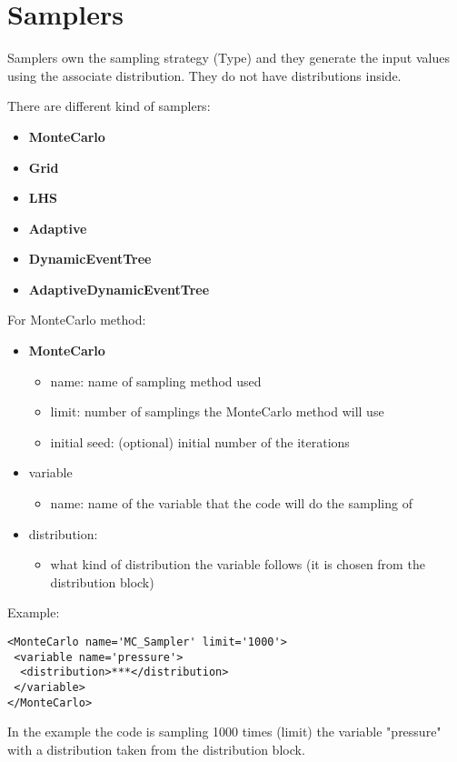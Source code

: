 \section{Samplers  \\ \vspace{2 mm} {\small }}

Samplers own the sampling strategy (Type) and they generate the input values using the associate distribution. They do not have distributions inside.

There are different kind of samplers:
\begin{itemize}
\item \textbf{MonteCarlo}
\item \textbf{Grid}
\item \textbf{LHS}
\item \textbf{Adaptive}
\item \textbf{DynamicEventTree}
\item \textbf{AdaptiveDynamicEventTree}
\end{itemize}

For MonteCarlo method: 
\begin{itemize}
\item \textbf{MonteCarlo}
\begin{itemize}
\item name: name of sampling method used
\item limit: number of samplings the MonteCarlo method will use
\item initial seed: (optional) initial number of the iterations
\end{itemize}
\item variable 
\begin{itemize}
\item name: name of the variable that the code will do the sampling of
\end{itemize}
\item distribution: 
\begin{itemize}
\item what kind of distribution the variable follows (it is chosen from the distribution block)
\end{itemize}
\end{itemize}

Example:

\begin{lstlisting}[style=XML]
<MonteCarlo name='MC_Sampler' limit='1000'> 
 <variable name='pressure'> 
  <distribution>***</distribution> 	
 </variable> 
</MonteCarlo> 
\end{lstlisting}
In the example the code is sampling 1000 times (limit) the variable "pressure" with a distribution taken from the distribution block.

